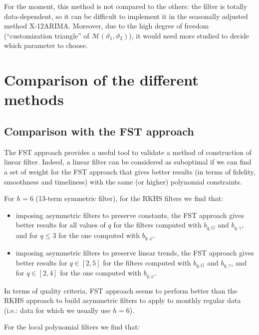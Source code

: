 \documentclass[fleqn,10pt]{latex/stylish_article} %
\newcommand\1{\mathds{1}}
\begin{document}
For the moment, this method is not compared to the others: the filter is totally data-dependent, so it can be difficult to implement it in the seasonally adjusted method X-12ARIMA. Moreover, due to the high degree of freedom (``customization triangle'' of \(\mathcal{M}(\vartheta_{1},\vartheta_{2})\)), it would need more studied to decide which parameter to choose.

\hypertarget{comparison-of-the-different-methods}{%
\section{Comparison of the different methods}\label{comparison-of-the-different-methods}}

\hypertarget{comparison-with-the-fst-approach}{%
\subsection{Comparison with the FST approach}\label{comparison-with-the-fst-approach}}

The FST approach provides a useful tool to validate a method of construction of linear filter.
Indeed, a linear filter can be considered as suboptimal if we can find a set of weight for the FST approach that gives better results (in terms of fidelity, smoothness and timeliness) with the same (or higher) polynomial constraints.

For \(h=6\) (13-term symmetric filter), for the RKHS filters we find that:

\begin{itemize}
\item
  imposing asymmetric filters to preserve constants, the FST approach gives better results for all values of \(q\) for the filters computed with \(b_{q,G}\) and \(b_{q,\gamma}\), and for \(q\leq 3\) for the one computed with \(b_{q,\varphi}\).
\item
  imposing asymmetric filters to preserve linear trends, the FST approach gives better results for \(q\in[2,5]\) for the filters computed with \(b_{q,G}\) and \(b_{q,\gamma}\), and for \(q\in[2,4]\) for the one computed with \(b_{q,\varphi}\).
\end{itemize}

\faArrowCircleRight{} In terms of quality criteria, FST approach seems to perform better than the RKHS approach to build asymmetric filters to apply to monthly regular data (i.e.: data for which we usually use \(h=6\)).

For the local polynomial filters we find that:
\end{document}
